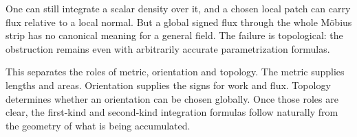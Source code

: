 One can still integrate a scalar density over it, and a chosen local patch can carry flux relative to a local normal. But a global signed flux through the whole Möbius strip has no canonical meaning for a general field. The failure is topological: the obstruction remains even with arbitrarily accurate parametrization formulas.

This separates the roles of metric, orientation and topology. The metric supplies lengths and areas. Orientation supplies the signs for work and flux. Topology determines whether an orientation can be chosen globally. Once those roles are clear, the first-kind and second-kind integration formulas follow naturally from the geometry of what is being accumulated.
